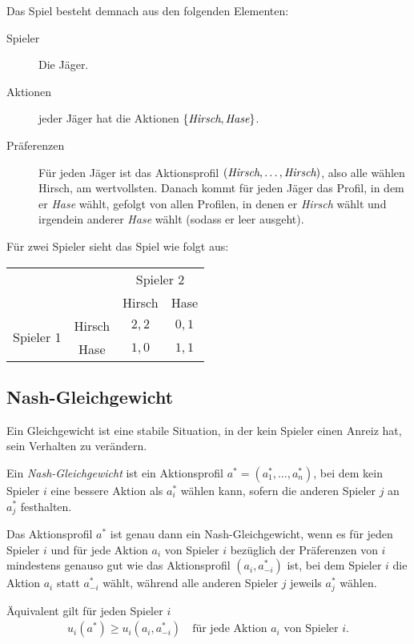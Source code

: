 Das Spiel besteht demnach aus den folgenden Elementen:
\begin{description}
  \item[Spieler] Die Jäger.
  \item[Aktionen] jeder Jäger hat die Aktionen $\{\emph{Hirsch}, \emph{Hase}\}$.
  \item[Präferenzen] Für jeden Jäger ist das Aktionsprofil $(\emph{Hirsch}, \ldots,
    \emph{Hirsch})$, also alle wählen Hirsch, am wertvollsten.
    Danach kommt für jeden Jäger das Profil, in dem er \emph{Hase} wählt, gefolgt von
    allen Profilen, in denen er \emph{Hirsch} wählt und irgendein anderer \emph{Hase}
    wählt (sodass er leer ausgeht).
\end{description}
Für zwei Spieler sieht das Spiel wie folgt aus:
\begin{center}
  \begin{tabular}{cccc}
    & & \multicolumn{2}{c}{Spieler 2}\\
    & & Hirsch & Hase\\
    \cmidrule{3-4}
    \multirow{2}{*}{Spieler 1}
      & Hirsch & $2, 2$ & $0,1$\\
    \cmidrule{3-4}
      & Hase   & $1, 0$ & $1,1$\\
    \cmidrule{3-4}
  \end{tabular}
\end{center}

\subsection{Nash-Gleichgewicht}%
\label{sub:nash_gleichgewicht}

Ein Gleichgewicht ist eine stabile Situation, in der kein Spieler einen Anreiz hat, sein
Verhalten zu verändern.

Ein \emph{Nash-Gleichgewicht} ist ein Aktionsprofil $a^* = (a^*_1, \ldots, a^*_n)$,
bei dem kein Spieler $i$ eine bessere Aktion als $a^*_i$ wählen kann,
sofern die anderen Spieler $j$ an $a^*_j$ festhalten.

\begin{definition}
  Das Aktionsprofil $a^*$ ist genau dann ein Nash-Gleichgewicht,
  wenn es für jeden Spieler $i$ und für jede Aktion $a_i$ von Spieler $i$
  bezüglich der Präferenzen von $i$
  mindestens genauso gut wie das Aktionsprofil $(a_i, a^*_{-i})$ ist,
  bei dem Spieler $i$ die Aktion $a_i$ statt $a^*_{-i}$ wählt,
  während alle anderen Spieler $j$ jeweils $a^*_j$ wählen.

  Äquivalent gilt für jeden Spieler $i$
  \begin{align*}
    u_i(a^*) \geq u_i(a_i, a^*_{-i}) \quad \text{für jede Aktion $a_i$ von Spieler $i$.}
  \end{align*}
\end{definition}

